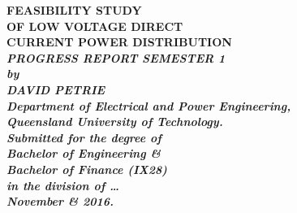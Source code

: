 \begin{titlepage}
\renewcommand{\baselinestretch}{1.0}
\begin{center}
\vspace*{35mm}
\Huge\bf
		FEASIBILITY STUDY\\
		OF LOW VOLTAGE DIRECT\\
		CURRENT POWER DISTRIBUTION\\
\vspace{7mm}
\large\sl\bf
		PROGRESS REPORT SEMESTER 1\\
\vspace{15mm}
\large\sl
		by\\
		DAVID PETRIE
		\medskip\\
\rm
		Department of Electrical and Power Engineering,\\
		Queensland University of Technology.\\
\vspace{30mm}
		Submitted for the degree of\\
		Bachelor of Engineering \& \\
		Bachelor of Finance (IX28)
		\smallskip\\ [2cm]
\normalsize
		in the division of \ldots
		\medskip\\
\large
		November \& 2016.		
\end{center}
\end{titlepage}